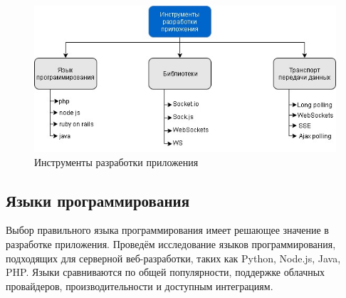\begin{figure}
	\centering
	\includegraphics[scale=0.7]{my_folder/images/ApplicationDevelopmentTools}
	\caption{Инструменты разработки приложения}
	\label{fig:ApplicationDevelopmentTools}
\end{figure}
	
\subsection{Языки программирования} \label{ch2:subsec-abbr-programming-languages} %









	


%









Выбор правильного языка программирования имеет решающее значение в разработке приложения. Проведём исследование языков программирования, подходящих для серверной веб-разработки, таких как Python, Node.js, Java, PHP. Языки сравниваются по общей популярности, поддержке облачных провайдеров, производительности и доступным интеграциям.

